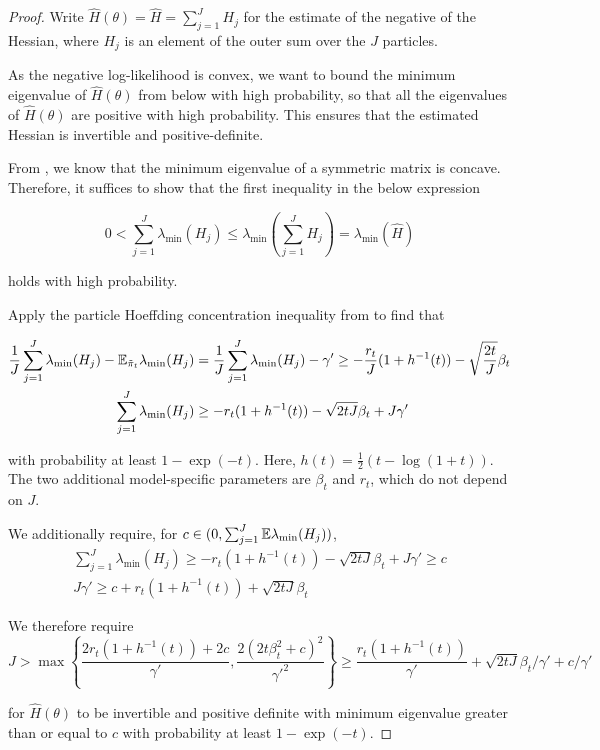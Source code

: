 \documentclass{article}
\begin{document}
\begin{proof}
Write $\hat{H}(\theta) = \hat{H} = \sum_{j=1}^J H_j$ for the estimate of the negative of the Hessian, where $H_j$ is an element of the outer sum over the $J$ particles.

 As the negative log-likelihood is convex, we want to bound the minimum eigenvalue of $\hat{H}(\theta)$ from below with high probability, so that all the eigenvalues of $\hat{H}(\theta)$ are positive with high probability. This ensures that the estimated Hessian is invertible and positive-definite.

From \cite{boyd2004convex}, we know that the minimum eigenvalue of a symmetric matrix is concave. Therefore, it suffices to show that the first inequality in the below expression

\begin{equation}
    0 < \sum_{j=1}^J \lambda_{\min} (H_j) \leq  \lambda_{\min}\left(\sum_{j=1}^J H_j\right) = \lambda_{\min} (\hat{H})
\end{equation}

holds with high probability.

Apply the particle Hoeffding concentration inequality from \cite{delmoral2011ci} to find that  


\begin{align}
    \frac{1}{J}\sum_{j=1}^J \lambda_{\min}(H_j) - \mathbb{E}_{\tilde{\pi}_t}\lambda_{\min}(H_j) &= \frac{1}{J}\sum_{j=1}^J \lambda_{\min}(H_j) - \gamma' \geq -\frac{r_t}{J}(1+h^{-1}(t)) - \sqrt{\frac{2t}{J}}\beta_t \\
    \sum_{j=1}^J \lambda_{\min}(H_j) &\geq -r_t(1+h^{-1}(t)) - \sqrt{2tJ}\beta_t + J\gamma'
\end{align}


with probability at least $1-\exp(-t)$. Here, $h(t) = \frac{1}{2}(t - \log(1+t))$. The two additional model-specific parameters are $\beta_t$ and $r_t$, which do not depend on $J$. 

We additionally require, for $c \in (0, \sum_{j=1}^J \mathbb{E}\lambda_{\min}(H_j))$,
\begin{align}
    \sum_{j=1}^J \lambda_{\min}(H_j) \geq -r_t(1+h^{-1}(t)) - \sqrt{2tJ}\beta_t + J\gamma' \geq c \\
    J\gamma' \geq c + r_t(1+h^{-1}(t)) + \sqrt{2tJ}\beta_t 
\end{align}

We therefore require $$J > \max\left\{\frac{2r_t(1+h^{-1}(t)) + 2c}{\gamma'}, \frac{2(2t\beta_t^2+c)^2}{\gamma'^2}\right\} \geq  \frac{r_t(1+h^{-1}(t))}{\gamma'} + \sqrt{2tJ}\beta_t/\gamma' + c/\gamma'$$

for $\hat{H}(\theta)$ to be invertible and positive definite with minimum eigenvalue greater than or equal to $c$ with probability at least $1-\exp(-t)$.

\end{proof}
\end{document}
